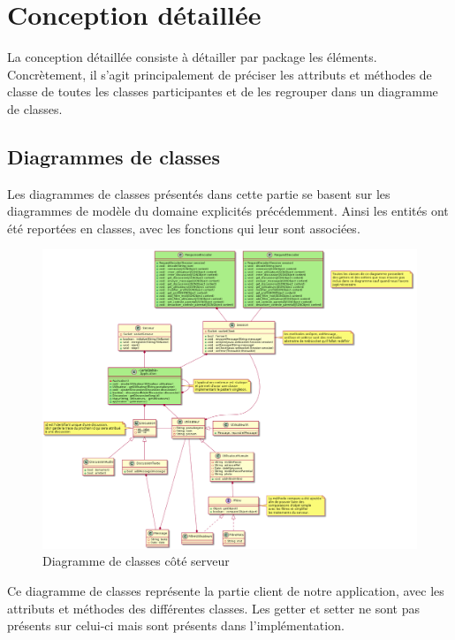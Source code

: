 \section{Conception détaillée}
	
	La conception détaillée consiste à détailler par package les éléments. Concrètement, il s’agit principalement de préciser les attributs et méthodes de classe de toutes les classes
participantes et de les regrouper dans un diagramme de classes.

	\subsection{Diagrammes de classes}
	Les diagrammes de classes présentés dans cette partie se basent sur les diagrammes de modèle du domaine explicités précédemment.
	Ainsi les entités ont été reportées en classes, avec les fonctions qui leur sont associées.
	
	\newpage
	\begin{figure}[H]
		\centerline{\includegraphics[width=19cm]{img/classesServeurV2.png}}
		\caption{Diagramme de classes côté serveur}
	\end{figure}

	\newpage

	Ce diagramme de classes représente la partie client de notre application, avec les attributs et méthodes des différentes classes.
	Les getter et setter ne sont pas présents sur celui-ci mais sont présents dans l'implémentation.
	
